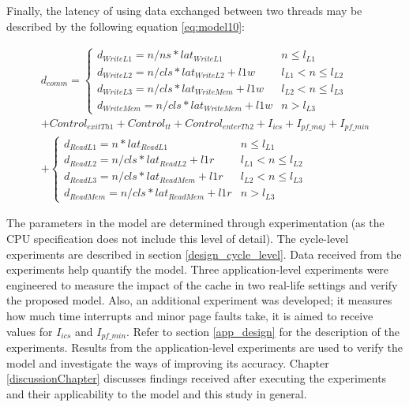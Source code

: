 Finally, the latency of using data exchanged between two threads may be described by the following equation \ref{eq:model10}:

\begin{equation}\label{eq:model10}
\begin{split}
d_{comm} = \begin{cases}d_{WriteL1}= n/ns * lat_{WriteL1} & n \leq l_{L1}\\d_{WriteL2} = n/cls * lat_{WriteL2} + l1w & l_{L1} < n \leq l_{L2}\\d_{WriteL3} = n/cls * lat_{WriteMem} + l1w & l_{L2} < n \leq l_{L3}\\d_{WriteMem} = n/cls * lat_{WriteMem} + l1w & n > l_{L3}\end{cases} \\ + Control_{exitTh1} + Control_{tt} + Control_{enterTh2} + I_{ics} + I_{pf\_maj} + I_{pf\_min} \\ + \begin{cases}d_{ReadL1}= n * lat_{ReadL1} & n \leq l_{L1}\\d_{ReadL2} = n/cls * lat_{ReadL2} + l1r & l_{L1} < n \leq l_{L2}\\d_{ReadL3} = n/cls * lat_{ReadMem} + l1r & l_{L2} < n \leq l_{L3}\\d_{ReadMem} = n/cls * lat_{ReadMem} + l1r & n > l_{L3}\end{cases}
\end{split}
\end{equation}

The parameters in the model are determined through experimentation (as the CPU specification does not include this level of detail). The cycle-level experiments are described in section \ref{design_cycle_level}. Data received from the experiments help quantify the model. Three application-level experiments were engineered to measure the impact of the cache in two real-life settings and verify the proposed model. Also, an additional experiment was developed; it measures how much time interrupts and minor page faults take, it is aimed to receive values for $I_{ics}$ and $I_{pf\_min}$. Refer to section \ref{app_design} for the description of the experiments. Results from the application-level experiments are used to verify the model and investigate the ways of improving its accuracy. Chapter \ref{discussionChapter} discusses findings received after executing the experiments and their applicability to the model and this study in general.

